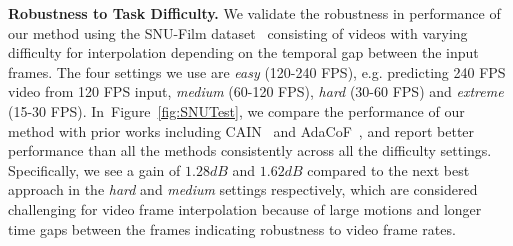 \documentclass[10pt,twocolumn,letterpaper]{article}
\newcommand{\figref}[1]{Figure~\ref{#1}}
\begin{document}
{\bf Robustness to Task Difficulty.}
We validate the robustness in performance of our method using the SNU-Film dataset~\cite{choi2020channel} consisting of videos with varying difficulty for interpolation depending on the temporal gap between the input frames.
The four settings we use are \textit{easy} (120-240 FPS), e.g. predicting 240 FPS video from 120 FPS input, \textit{medium} (60-120 FPS), \textit{hard} (30-60 FPS) and \textit{extreme} (15-30 FPS). In~\figref{fig:SNUTest}, we compare the performance of our method with prior works including CAIN~\cite{choi2020channel} and AdaCoF~\cite{lee2020adacof}, and report better performance than all the methods consistently across all the difficulty settings. Specifically, we see a gain of $1.28 dB$ and $1.62 dB$ compared to the next best approach \cite{choi2020channel} in the \textit{hard} and \textit{medium} settings respectively, which are considered challenging for video frame interpolation because of large motions and longer time gaps between the frames indicating robustness to video frame rates.
\end{document}
